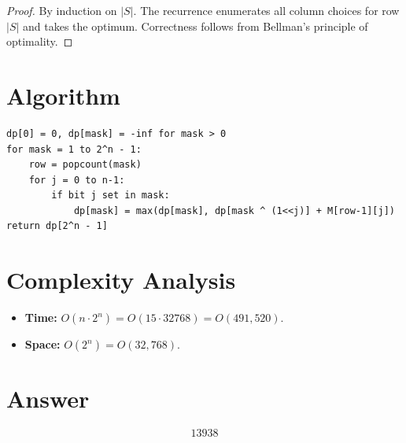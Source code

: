 \documentclass[a4paper,12pt]{article}
\begin{document}
\begin{proof}
By induction on $|S|$. The recurrence enumerates all column choices for row $|S|$ and takes the optimum. Correctness follows from Bellman's principle of optimality.
\end{proof}

\section{Algorithm}

\begin{verbatim}
dp[0] = 0, dp[mask] = -inf for mask > 0
for mask = 1 to 2^n - 1:
    row = popcount(mask)
    for j = 0 to n-1:
        if bit j set in mask:
            dp[mask] = max(dp[mask], dp[mask ^ (1<<j)] + M[row-1][j])
return dp[2^n - 1]
\end{verbatim}

\section{Complexity Analysis}
\begin{itemize}
    \item \textbf{Time:} $O(n \cdot 2^n) = O(15 \cdot 32768) = O(491{,}520)$.
    \item \textbf{Space:} $O(2^n) = O(32{,}768)$.
\end{itemize}

\section{Answer}

\[
\boxed{13938}
\]
\end{document}
